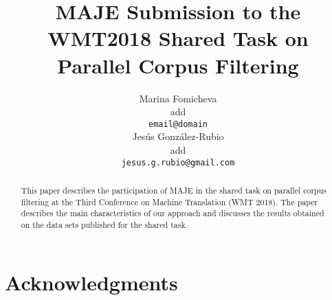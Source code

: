 \documentclass[11pt,a4paper]{article}
\title{MAJE Submission to the WMT2018 Shared Task on\\Parallel Corpus Filtering}
\author{Marina Fomicheva \\
  add \\
  {\tt email@domain} \\\And
  Jes\'us Gonz\'alez-Rubio \\
  add\\
  {\tt jesus.g.rubio@gmail.com} \\}
\date{}
\begin{document}
\maketitle
\begin{abstract}
  This paper describes the participation of MAJE in the shared task on parallel corpus filtering at the Third Conference on Machine Translation (WMT 2018). The paper describes the main characteristics of our approach and discusses the results obtained on the data sets published for the shared task.
\end{abstract}








\section*{Acknowledgments}





\end{document}
